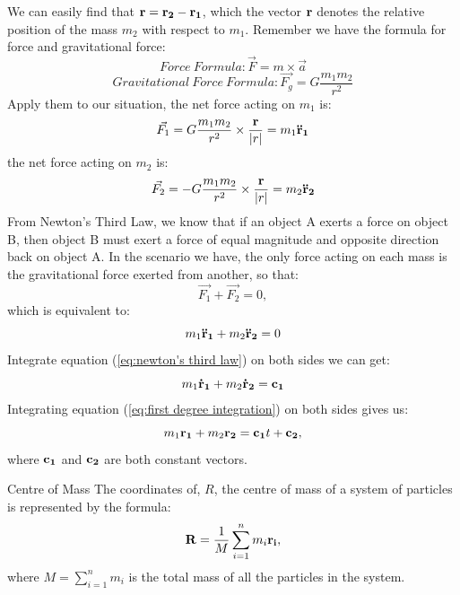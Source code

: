 We can easily find that $\bf{r} = \bf{r_2} - \bf{r_1}$, which the vector $\bf{r}$ denotes the relative position of the mass $m_2$ with respect to $m_1$. Remember we have the formula for force and gravitational force:
\begin{equation}
    Force ~Formula: \vec{F} = m \times \vec{a}
\end{equation}
\begin{equation}
    Gravitational ~Force ~Formula: \vec{F_{g}} = G \frac{m_{1}m_{2}}{r^2}
\end{equation}
Apply them to our situation, the net force acting on $m_1$ is:
\begin{equation}
    \vec{F_{1}} = G\frac{m_{1}m_{2}}{r^2} \times \frac{\bf{r}}{\left| r \right|} = m_{1}\bf{\ddot{r}_{1}}
    \label{eq:force on m1}
\end{equation}
the net force acting on $m_2$ is:
\begin{equation}
    \vec{F_{2}} = -G\frac{m_{1}m_{2}}{r^2} \times \frac{\bf{r}}{\left| r \right|} = m_{2}\bf{\ddot{r}_{2}}  
    \label{eq:force on m2}
\end{equation}
From Newton's Third Law, we know that if an object A exerts a force on object B, then object B must exert a force of equal magnitude and opposite direction back on object A. In the scenario we have, the only force acting on each mass is the gravitational force exerted from another, so that:
\begin{equation}
    \vec{F_1} + \vec{F_2} = 0,
\end{equation}
which is equivalent to:
\begin{equation}
    m_{1} {\bf{\ddot{r}}_{1}} + m_{2} {\bf{\ddot{r}}_2} = 0
    \label{eq:newton's third law}
\end{equation}
Integrate equation (\ref{eq:newton's third law}) on both sides we can get:
\begin{equation}
    m_{1} {\bf{\dot{r}}_{1}} + m_{2} {\bf{\dot{r}}_2} = {\bf{c_1}}
    \label{eq:first degree integration}
\end{equation}
Integrating equation (\ref{eq:first degree integration}) on both sides gives us:
\begin{equation}
    m_{1} {\bf{r}_{1}} + m_{2} {\bf{r}_2} = {\bf{c_1}} t + {\bf{c_2}},
    \label{eq:second degree integration}
\end{equation}
where $\bf{c_1}$ and $\bf{c_2}$ are both constant vectors.

\begin{Definition}{Centre of Mass}{}
    The coordinates of, $R$, the centre of mass of a system of particles is represented by the formula:
    \begin{equation}
        {\bf{R}} = \frac{1}{M} \sum_{i=1}^{n}m_{i}{\bf{r_{i}}},
    \end{equation}
    where $M = \sum_{i=1}^{n}m_{i}$ is the total mass of all the particles in the system. 
\end{Definition}


